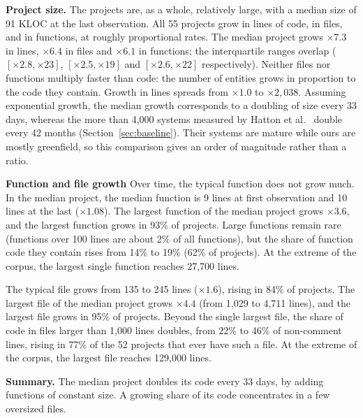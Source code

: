 \documentclass[smallextended]{svjour3}
\begin{document}
\textbf{Project size.}
The projects are, as a whole, relatively large, with a median size of 91 KLOC at the last observation.
All 55 projects grow in lines of code, in files, and in functions, at
roughly proportional rates. The median project grows $\times 7.3$ in lines, $\times 6.4$ in files and
$\times 6.1$ in functions; the interquartile ranges overlap
($[\times 2.8, \times 23]$, $[\times 2.5, \times 19]$ and
$[\times 2.6, \times 22]$ respectively). Neither files nor functions
multiply faster than code: the number of entities grows in proportion to
the code they contain.
Growth in lines spreads from $\times 1.0$ to $\times 2{,}038$.
Assuming exponential growth, the median growth corresponds to a doubling of size every 33 days, whereas the more than 4{,}000 systems measured by Hatton et al.~\cite{hatton2017growth} double every 42 months (Section~\ref{sec:baseline}).
Their systems are mature while ours are mostly greenfield, so this comparison gives an order of magnitude rather than a ratio.

\textbf{Function and file growth}
Over time, the typical function does not grow much. In the median project, the median
function is 9 lines at first observation and 10 lines
at the last ($\times 1.08$). 
The largest function of the median project grows $\times 3.6$, and the largest function grows in 93\% of projects.
Large functions remain rare (functions over 100 lines are
about 2\% of all functions), but the share of function code they
contain rises from 14\% to 19\% (62\% of projects).
At the extreme of the corpus, the largest single function reaches 27{,}700 lines.

The typical file grows from 135 to 245
lines ($\times 1.6$), rising in 84\% of projects.
The largest file of the median
project grows $\times 4.4$ (from 1{,}029 to 4{,}711 lines), and the largest file grows in 95\% of
projects. Beyond the single largest file, the share of
code in files larger than 1{,}000 lines doubles, from 22\% to 46\% of
non-comment lines, rising in 77\% of the 52 projects that ever have
such a file.
At the extreme of the corpus, the largest file reaches 129{,}000 lines.

\textbf{Summary.}
The median project doubles its code every 33 days, by adding functions of constant size.
A growing share of its code concentrates in a few oversized files.
\end{document}
